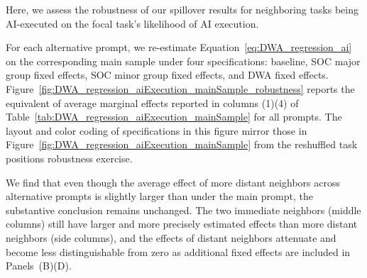 Here, we assess the robustness of our spillover results for neighboring tasks being AI-executed on the focal task's likelihood of AI execution.

For each alternative prompt, we re-estimate Equation~\eqref{eq:DWA_regression_ai} on the corresponding main sample under four specifications: baseline, SOC major group fixed effects, SOC minor group fixed effects, and DWA fixed effects.
Figure~\ref{fig:DWA_regression_aiExecution_mainSample_robustness} reports the equivalent of average marginal effects reported in columns (1)\textendash(4) of Table~\ref{tab:DWA_regression_aiExecution_mainSample} for all prompts.
The layout and color coding of specifications in this figure mirror those in Figure~\ref{fig:DWA_regression_aiExecution_mainSample} from the reshuffled task positions robustness exercise.

We find that even though the average effect of more distant neighbors across alternative prompts is slightly larger than under the main prompt, the substantive conclusion remains unchanged.
The two immediate neighbors (middle columns) still have larger and more precisely estimated effects than more distant neighbors (side columns), and the effects of distant neighbors attenuate and become less distinguishable from zero as additional fixed effects are included in Panels~(B)\textendash (D).

